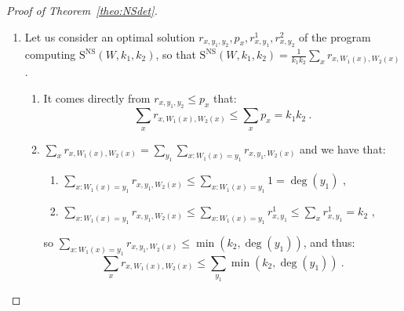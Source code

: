 \begin{proof}[Proof of Theorem~\ref{theo:NSdet}]
\begin{enumerate}
as $0 \leq 1-\left(1-\frac{1}{\ell_2}\right)^{k_2} \leq 1$. Thus:

\begin{equation}
  \begin{aligned}
    \mathbb{E}\left[\varphi(\deg_{\mathcal{Y}_1,\mathcal{P}_2}(\mathcal{P}_2^{i_2})))\right] &\geq \alpha_{\varphi}\left(1-\left(1-\frac{1}{\ell_2}\right)^{k_2}\right)\min\left(k_1,\frac{1}{k_2}\sum_{y_1}\min\left(k_2,\deg(y_1)\right)\right)\\
    &= \frac{1}{k_2}\left(1 - \frac{k_1^{k_1}e^{-k_1}}{k_1!}\right)\left(1-\left(1-\frac{1}{\ell_2}\right)^{k_2}\right)\min\left(k_1k_2,\sum_{y_1}\min\left(k_2,\deg(y_1)\right)\right)\\
  \end{aligned}
\end{equation}

since $\alpha_{\varphi} = 1 - \frac{k_1^{k_1}e^{-k_1}}{k_1!}$.

Finally, $\mathbb{E}\left[\sum_{i_2=1}^{\ell_2}\min\left(k_1,\deg_{\mathcal{Y}_1,\mathcal{P}_2}(\mathcal{P}_2^{i_2})\right)\right] = \sum_{i_2=1}^{\ell_2}\mathbb{E}\left[\varphi(\deg_{\mathcal{Y}_1,\mathcal{P}_2}(\mathcal{P}_2^{i_2}))\right]$, so we get that
\[ \mathbb{E}\left[\sum_{i_2=1}^{\ell_2}\min\left(k_1,\deg_{\mathcal{Y}_1,\mathcal{P}_2}(\mathcal{P}_2^{i_2})\right)\right] \]
is larger than
\[ \frac{\ell_2}{k_2}\left(1 - \frac{k_1^{k_1}e^{-k_1}}{k_1!}\right)\left(1-\left(1-\frac{1}{\ell_2}\right)^{k_2}\right)\min\left(k_1k_2,\sum_{y_1}\min\left(k_2,\deg(y_1)\right)\right) \ . \]

Thus, in particular, there exists some partition $\mathcal{P}_2$ that satisfies the same inequality, which concludes the second part of the proof.

\item Let us consider an optimal solution $r_{x,y_1,y_2},p_x,r^1_{x,y_1},r^2_{x,y_2}$ of the program computing $\mathrm{S}^{\textrm{NS}}(W,k_1,k_2)$, so that $\mathrm{S}^{\textrm{NS}}(W,k_1,k_2) = \frac{1}{k_1k_2}\sum_x r_{x,W_1(x),W_2(x)}$.
  \begin{enumerate}
  \item It comes directly from $r_{x,y_1,y_2} \leq p_x$ that:
    \[ \sum_x r_{x,W_1(x),W_2(x)} \leq \sum_x p_x = k_1k_2 \ . \]
  \item $\sum_x r_{x,W_1(x),W_2(x)} = \sum_{y_1}\sum_{x:W_1(x)=y_1} r_{x,y_1,W_2(x)}$ and we have that:
    \begin{enumerate}
    \item $\sum_{x:W_1(x)=y_1} r_{x,y_1,W_2(x)} \leq \sum_{x:W_1(x)=y_1} 1 = \deg(y_1)$ ,
    \item $\sum_{x:W_1(x)=y_1} r_{x,y_1,W_2(x)} \leq \sum_{x:W_1(x)=y_1} r^1_{x,y_1} \leq \sum_x r^1_{x,y_1} = k_2$ ,
    \end{enumerate}
    so $\sum_{x:W_1(x)=y_1} r_{x,y_1,W_2(x)} \leq \min(k_2,\deg(y_1))$, and thus:
    \[ \sum_x r_{x,W_1(x),W_2(x)} \leq \sum_{y_1}\min(k_2,\deg(y_1)) \ .\]
  \end{enumerate}


\end{enumerate}
\end{proof}
